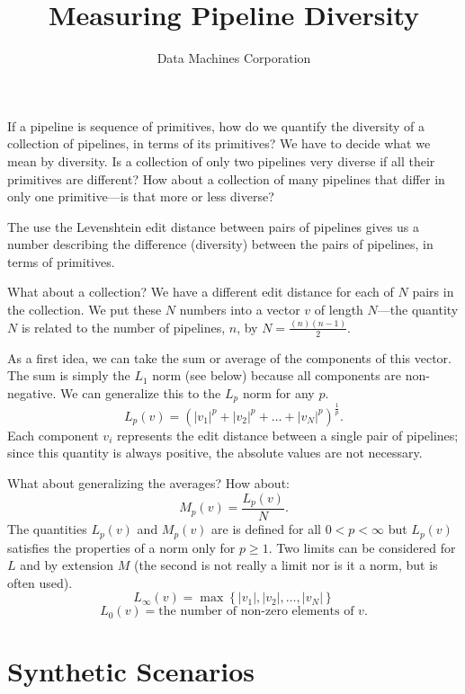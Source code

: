 \documentclass{article}
\title{Measuring Pipeline Diversity}
\author{Data Machines Corporation}
\begin{document}
\maketitle

If a pipeline is sequence of primitives, how do we quantify the
diversity of a collection of pipelines, in terms of its primitives?
We have to decide what we mean by diversity.  Is a collection of only
two pipelines very diverse if all their primitives are different?  How
about a collection of many pipelines that differ in only one
primitive---is that more or less diverse?

The use the Levenshtein edit distance between pairs of pipelines gives
us a number describing the difference (diversity) between the pairs of
pipelines, in terms of primitives.

What about a collection?  We have a different edit distance for each
of $N$ pairs in the collection.  We put these $N$ numbers into a
vector $v$ of length $N$---the quantity $N$ is related to the number
of pipelines, $n$, by $N = \frac{(n)(n-1)}{2}$.

As a first idea, we can take the sum or average of the components of
this vector.  The sum is simply the $L_1$ norm (see below) because all
components are non-negative.  We can generalize this to the $L_p$ norm
for any $p$.
$$L_p(v) = \left(|v_1|^p + |v_2|^p + \dots +
|v_N|^p\right)^\frac{1}{p}.$$ Each component $v_i$ represents the edit
distance between a single pair of pipelines; since this quantity is
always positive, the absolute values are not necessary.

What about generalizing the averages?  How about:
$$M_p(v) = \frac{L_p(v)}{N}.$$ The quantities $L_p(v)$ and $M_p(v)$
are is defined for all $0 < p < \infty$ but $L_p(v)$ satisfies the
properties of a norm only for $p \geq 1$. Two limits can be considered
for $L$ and by extension $M$ (the second is not really a limit nor is
it a norm, but is often used).
$$L_\infty(v) = \max\left\{|v_1|, |v_2|, \dots, |v_N|\right\}$$
$$L_0(v) = \mbox{the number of non-zero elements of $v$}.$$

\newpage
\section{Synthetic Scenarios}
\end{document}
